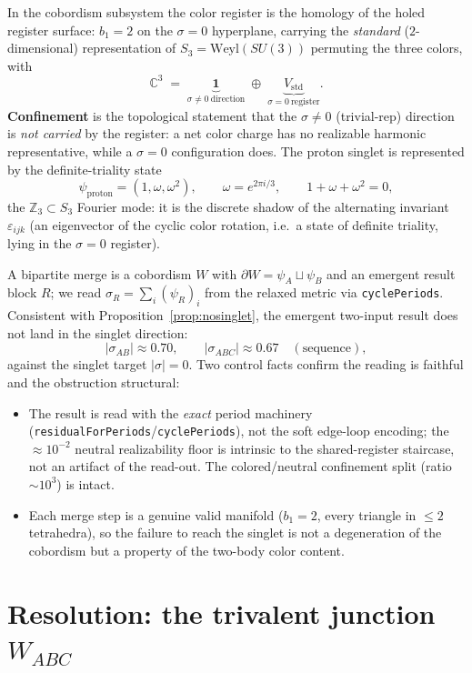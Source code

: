 \documentclass[11pt]{article}
\theoremstyle{definition}
\newcommand{\C}{\mathbb{C}}
\newcommand{\Z}{\mathbb{Z}}
\newcommand{\triv}{\mathbf{1}}         %
\newcommand{\sigmacol}{\sigma}         %
\begin{document}
In the cobordism subsystem the color register is the homology of the holed
register surface: $b_1=2$ on the $\sigmacol=0$ hyperplane, carrying the
\emph{standard} ($2$-dimensional) representation of $S_3=\mathrm{Weyl}(SU(3))$
permuting the three colors, with
\[
  \C^3 \;=\; \underbrace{\triv}_{\sigmacol\neq0\ \text{direction}}
            \;\oplus\;
            \underbrace{V_{\text{std}}}_{\sigmacol=0\ \text{register}} .
\]
\textbf{Confinement} is the topological statement that the $\sigmacol\neq0$
(trivial-rep) direction is \emph{not carried} by the register: a net color charge
has no realizable harmonic representative, while a $\sigmacol=0$ configuration
does. The proton singlet is represented by the definite-triality state
\[
  \psi_{\text{proton}}=(1,\omega,\omega^2),\qquad \omega=e^{2\pi i/3},
  \qquad 1+\omega+\omega^2=0 ,
\]
the $\Z_3\subset S_3$ Fourier mode: it is the discrete shadow of the alternating
invariant $\varepsilon_{ijk}$ (an eigenvector of the cyclic color rotation, i.e.\
a state of definite triality, lying in the $\sigmacol=0$ register).

A bipartite merge is a cobordism $W$ with $\partial W=\psi_A\sqcup\psi_B$ and an
emergent result block $R$; we read $\sigmacol_R=\sum_i (\psi_R)_i$ from the
relaxed metric via \texttt{cyclePeriods}. Consistent with
Proposition~\ref{prop:nosinglet}, the emergent two-input result does not land in
the singlet direction:
\[
  |\sigmacol_{AB}|\approx 0.70,\qquad
  |\sigmacol_{ABC}|\approx 0.67 \quad(\text{sequence}),
\]
against the singlet target $|\sigmacol|=0$. Two control facts confirm the reading
is faithful and the obstruction structural:
\begin{itemize}[nosep]
  \item The result is read with the \emph{exact} period machinery
  (\texttt{residualForPeriods}/\texttt{cyclePeriods}), not the soft edge-loop
  encoding; the $\approx10^{-2}$ neutral realizability floor is intrinsic to the
  shared-register staircase, not an artifact of the read-out. The colored/neutral
  confinement split (ratio $\sim 10^3$) is intact.
  \item Each merge step is a genuine valid manifold ($b_1=2$, every triangle in
  $\le 2$ tetrahedra), so the failure to reach the singlet is not a degeneration
  of the cobordism but a property of the two-body color content.
\end{itemize}

\section{Resolution: the trivalent junction \texorpdfstring{$W_{ABC}$}{W\_ABC}}
\end{document}
